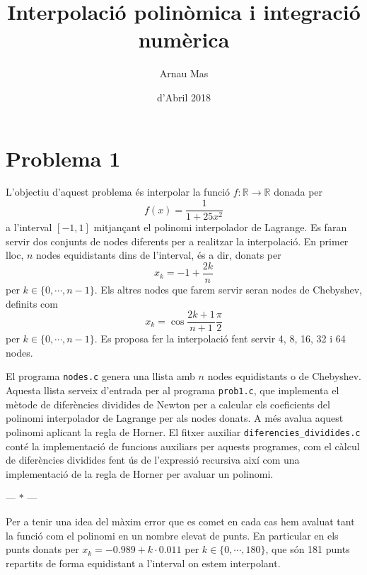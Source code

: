 \documentclass[12pt]{article}
\title{\sffamily {\bfseries Pràctica 3:} Interpolació polinòmica i integració numèrica}
\author{\sffamily Arnau Mas}
\date{\sffamily 24 d'Abril 2018}
\newcommand{\R}{\mathbb{R}}
\newcommand{\parbreak}{
	\begin{center}
		--- $\ast$ ---
	\end{center} 
}
\begin{document}
\maketitle

\section{Problema 1}
L'objectiu d'aquest problema és interpolar la funció \( f \colon \R \to \R \) donada per
\begin{equation*}
	f(x) = \frac{1}{1 + 25x^2}
\end{equation*}
a l'interval \( [-1,1] \) mitjançant el polinomi interpolador de Lagrange. Es faran servir dos conjunts de nodes diferents per a realitzar la interpolació. En primer lloc, \( n \) nodes equidistants dins de l'interval, és a dir, donats per
\begin{equation*}
x_k = -1 + \frac{2k}{n}
\end{equation*}
per \( k \in \{0, \cdots, n-1\} \). Els altres nodes que farem servir seran nodes de Chebyshev, definits com
\begin{equation*}
x_k = \cos{\frac{2k+1}{n+1} \frac{\pi}{2}}
\end{equation*}
per \( k \in \{0, \cdots, n-1\} \). Es proposa fer la interpolació fent servir 4, 8, 16, 32 i 64 nodes. 

El programa \texttt{nodes.c} genera una llista amb \( n \) nodes equidistants o de Chebyshev. Aquesta llista serveix d'entrada per al programa \texttt{prob1.c}, que implementa el mètode de diferències dividides de Newton per a calcular els coeficients del polinomi interpolador de Lagrange per als nodes donats. A més avalua aquest polinomi aplicant la regla de Horner. El fitxer auxiliar \texttt{diferencies\_dividides.c} conté la implementació de funcions auxiliars per aquests programes, com el càlcul de diferències dividides fent ús de l'expressió recursiva així com una implementació de la regla de Horner per avaluar un polinomi. 

\parbreak

Per a tenir una idea del màxim error que es comet en cada cas hem avaluat tant la funció com el polinomi en un nombre elevat de punts. En particular en els punts donats per \( x_k = \num{-0.989} + k \cdot \num{0.011} \) per \( k \in \{0, \cdots, 180\} \), que són 181 punts repartits de forma equidistant a l'interval on estem interpolant.  

\begin{figure}[htb]
\centering
\sffamily \footnotesize
	
\end{figure}
\end{document}
